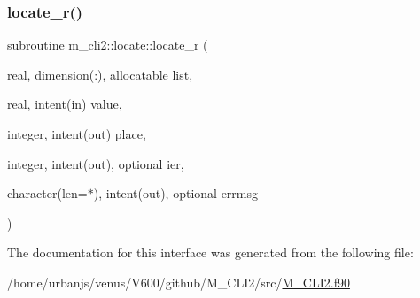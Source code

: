 \mbox{\label{interfacem__cli2_1_1locate_a93368b61603fe74c498b1190a502c271}} 
\subsubsection{\texorpdfstring{locate\+\_\+r()}{locate\_r()}}
{\footnotesize\ttfamily subroutine m\+\_\+cli2\+::locate\+::locate\+\_\+r (\begin{DoxyParamCaption}\item[{real, dimension(\+:), allocatable}]{list,  }\item[{real, intent(in)}]{value,  }\item[{integer, intent(out)}]{place,  }\item[{integer, intent(out), optional}]{ier,  }\item[{character(len=$\ast$), intent(out), optional}]{errmsg }\end{DoxyParamCaption})\hspace{0.3cm}{\ttfamily [private]}}



The documentation for this interface was generated from the following file\+:\begin{DoxyCompactItemize}
\item 
/home/urbanjs/venus/\+V600/github/\+M\+\_\+\+C\+L\+I2/src/\mbox{\hyperlink{M__CLI2_8f90}{M\+\_\+\+C\+L\+I2.\+f90}}\end{DoxyCompactItemize}
